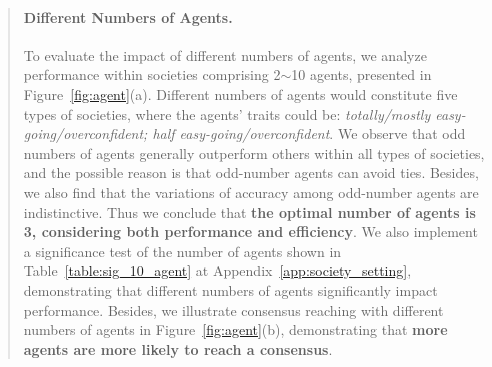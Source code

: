 \documentclass[11pt]{article}
\begin{document}
\begin{abstract}
\paragraph{Different Numbers of Agents.} 
To evaluate the impact of different numbers of agents, we analyze performance within societies comprising 2$\sim$10 agents, presented in Figure~\ref{fig:agent}(a). 
Different numbers of agents would constitute five types of societies, where the agents' traits could be: \emph{totally/mostly easy-going/overconfident; half easy-going/overconfident}. 
We observe that odd numbers of agents generally outperform others within all types of societies, and the possible reason is that odd-number agents can avoid ties. Besides, we also find that the variations of accuracy among odd-number agents are indistinctive. 
Thus we conclude that \textbf{the optimal number of agents is 3, considering both performance and efficiency}. 
We also implement a significance test of the number of agents shown in Table~\ref{table:sig_10_agent} at Appendix~\ref{app:society_setting}, demonstrating that different numbers of agents significantly impact performance. 
Besides, we illustrate consensus reaching with different numbers of agents in Figure~\ref{fig:agent}(b), demonstrating that \textbf{more agents are more likely to reach a consensus}. 


\end{abstract}
\end{document}
